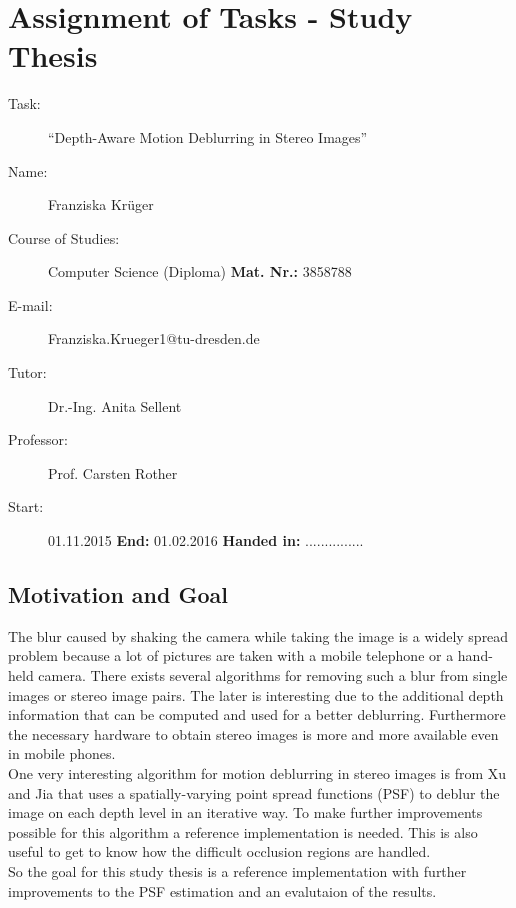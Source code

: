 \documentclass[a4paper, 12pt]{scrartcl}
\begin{document}
\section*{Assignment of Tasks - Study Thesis}
\begin{description}
\item[Task:] \enquote{Depth-Aware Motion Deblurring in Stereo Images}
\\
\item[Name:] Franziska Krüger
\item[Course of Studies:] Computer Science (Diploma)  \hfill{\textbf{Mat. Nr.:} 3858788}
\item[E-mail:] Franziska.Krueger1@tu-dresden.de
\\
\item[Tutor:] Dr.-Ing. Anita Sellent
\item[Professor:] Prof. Carsten Rother
\item[Start:] 01.11.2015  \hfill{\textbf{End:} 01.02.2016} \hfill{\textbf{Handed in:} ...............}
\end{description}


\subsection*{Motivation and Goal}
The blur caused by shaking the camera while taking the image is a widely spread problem because a lot of pictures are taken with a mobile telephone or a hand-held camera. There exists several algorithms for removing such a blur from single images or stereo image pairs. The later is interesting due to the additional depth information that can be computed and used for a better deblurring. Furthermore the necessary hardware to obtain stereo images is more and more available even in mobile phones.\\
One very interesting algorithm for motion deblurring in stereo images is from Xu and Jia that uses a spatially-varying point spread functions (PSF) to deblur the image on each depth level in an iterative way. To make further improvements possible for this algorithm a reference implementation is needed. This is also useful to get to know how the difficult occlusion regions are handled.
\\
So the goal for this study thesis is a reference implementation with further improvements to the PSF estimation and an evalutaion of the results.
\end{document}
